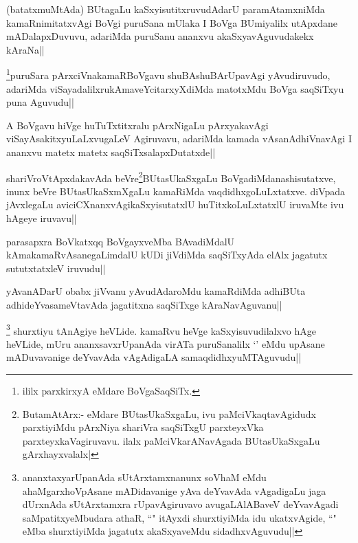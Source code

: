 \begin{artha}
(batatxmuMtAda) BUtagaLu kaSxyisutitxruvudAdarU paramAtamxniMda kamaRnimitatxvAgi BoVgi puruSana mUlaka I BoVga BUmiyalilx utApxdane mADalapxDuvuvu, adariMda puruSanu ananxvu akaSxyavAguvudakekx kAraNa||
\end{artha}

\begin{artha}
\footnote{ililx parxkirxyA eMdare BoVgaSaqSiTx.}puruSara pArxciVnakamaRBoVgavu shuBAshuBArUpavAgi yAvudiruvudo, adariMda viSayadalilxrukAmaveYcitarxyXdiMda matotxMdu BoVga saqSiTxyu puna Aguvudu||
\end{artha}

\begin{artha}
A BoVgavu hiVge huTuTxtitxralu pArxNigaLu pArxyakavAgi viSayAsakitxyuLaLxvugaLeV Agiruvavu, adariMda kamada vAsanAdhiVnavAgi I ananxvu matetx matetx saqSiTxsalapxDutatxde||
\end{artha}

\begin{artha}
shariVroVtApxdakavAda beVre\footnote[2]{ButamAtArx:- eMdare BUtasUkaSxgaLu, ivu paMciVkaqtavAgidudx parxtiyiMdu pArxNiya shariVra saqSiTxgU parxteyxVka parxteyxkaVagiruvavu. ilalx  paMciVkarANavAgada BUtasUkaSxgaLu gArxhayxvalalx|}BUtasUkaSxgaLu BoVgadiMdanashisutatxve, inunx beVre BUtasUkaSxmXgaLu kamaRiMda vaqdidhxgoLuLxtatxve. diVpada jAvxlegaLu aviciCXnanxvAgikaSxyisutatxlU huTitxkoLuLxtatxlU iruvaMte ivu hAgeye iruvavu||
\end{artha}

\begin{artha}
parasapxra BoVkatxqq BoVgayxveMba BAvadiMdalU kAmakamaRvAsanegaLimdalU kUDi jiVdiMda saqSiTxyAda elAlx jagatutx sututxtatxleV iruvudu||
\end{artha}

\begin{artha}
yAvanADarU obabx jiVvanu yAvudAdaroMdu kamaRdiMda adhiBUta adhideYvasameVtavAda jagatitxna saqSiTxge kAraNavAguvanu||
\end{artha}

\begin{artha}
\footnote{ananxtaxyarUpanAda sUtArxtamxnanunx soV\s haM eMdu ahaMgarxhoVpAsane mADidavanige yAva deYvavAda vAgadigaLu jaga dUrxnAda sUtArxtamxra rUpavAgiruvavo avugaLAlABaveV deYvavAgadi saMpatitxyeMbudara athaR, ``\stext" itAyxdi shurxtiyiMda idu ukatxvAgide, ``\stext" eMba shurxtiyiMda jagatutx akaSxyaveMdu sidadhxvAguvudu||} shurxtiyu tAnAgiye heVLide. kamaRvu heVge kaSxyisuvudilalxvo hAge heVLide, mUru ananxsavxrUpanAda virATa puruSanalilx `\stext' eMdu upAsane mADuvavanige deYvavAda vAgAdigaLA samaqdidhxyuMTAguvudu||
\end{artha}

